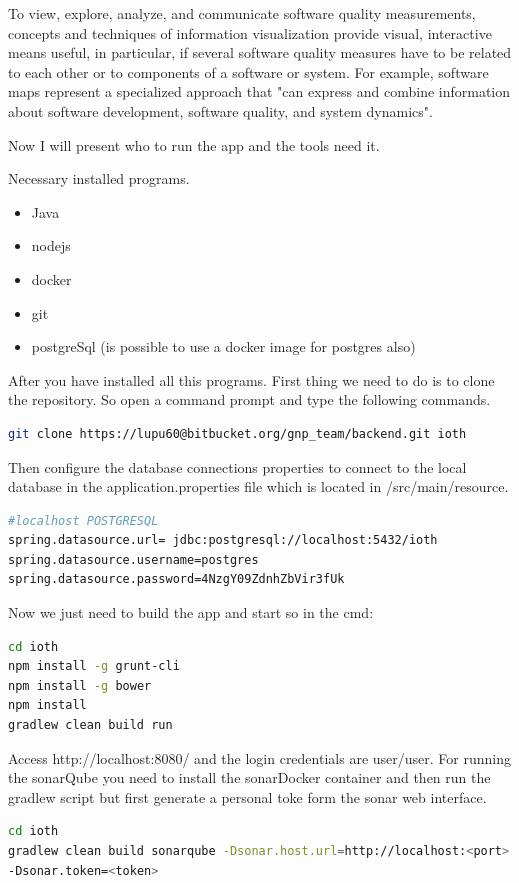 To view, explore, analyze, and communicate software quality measurements, concepts and techniques of information visualization provide visual, interactive means useful, in particular, if several software quality measures have to be related to each other or to components of a software or system. For example, software maps represent a specialized approach that "can express and combine information about software development, software quality, and system dynamics".
\newline

Now I will present who to run the app and the tools need it.

Necessary installed programs.
\begin{itemize}
	\item Java
	\item nodejs
	\item docker
	\item git
	\item postgreSql (is possible to use a docker image for postgres also)
\end{itemize}
\vspace{5mm}

After you have installed all this programs. First thing we need to do is to clone the repository. So open a command prompt and type the following commands.
\begin{lstlisting}[language=Bash]
git clone https://lupu60@bitbucket.org/gnp_team/backend.git ioth
\end{lstlisting}
\vspace{5mm}

Then configure the database connections properties to connect to the local database in the application.properties file which is located in /src/main/resource.
\begin{lstlisting}[language=Bash]
#localhost POSTGRESQL
spring.datasource.url= jdbc:postgresql://localhost:5432/ioth
spring.datasource.username=postgres
spring.datasource.password=4NzgY09ZdnhZbVir3fUk
\end{lstlisting}
\vspace{5mm}

Now we just need to build the app and start so in the cmd:
\begin{lstlisting}[language=Bash]
cd ioth
npm install -g grunt-cli
npm install -g bower
npm install
gradlew clean build run
\end{lstlisting}
\vspace{5mm}

Access http://localhost:8080/ and the login credentials are user/user. For running the sonarQube you need to install the sonarDocker container and then run the gradlew script but first generate a personal toke form the sonar web interface.
\begin{lstlisting}[language=Bash]
cd ioth
gradlew clean build sonarqube -Dsonar.host.url=http://localhost:<port>
-Dsonar.token=<token>
\end{lstlisting}
\vspace{5mm}

